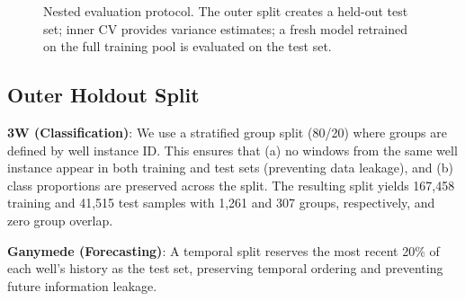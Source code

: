 \documentclass[conference]{IEEEtran}
\begin{document}
\begin{figure}[t]
\centering
{}
\caption{Nested evaluation protocol. The outer split creates a held-out test set; inner CV provides variance estimates; a fresh model retrained on the full training pool is evaluated on the test set.}
\label{fig:protocol}
\end{figure}

\subsection{Outer Holdout Split}

\textbf{3W (Classification)}: We use a stratified group split (80/20) where groups are defined by well instance ID. This ensures that (a) no windows from the same well instance appear in both training and test sets (preventing data leakage), and (b) class proportions are preserved across the split. The resulting split yields 167{,}458 training and 41{,}515 test samples with 1{,}261 and 307 groups, respectively, and zero group overlap.

\textbf{Ganymede (Forecasting)}: A temporal split reserves the most recent 20\% of each well's history as the test set, preserving temporal ordering and preventing future information leakage.
\end{document}

